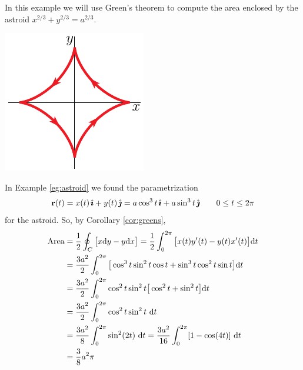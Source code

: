 \begin{eg}\label{eg:greenB}
In this example we will use Green's theorem to compute the area enclosed
by the astroid $x^{2/3} + y^{2/3} = a^{2/3}$.
\begin{nfig}
\begin{center}
    \includegraphics{astroid6.pdf}
\end{center}
\end{nfig}
In Example \ref{eg:astroid} we found the parametrization
\begin{equation*}
\mathbf{r}(t) = x(t)\,\hat{\pmb{\imath}} + y(t)\,\hat{\pmb{\jmath}} = a\cos^3t\,\hat{\pmb{\imath}} + a\sin^3 t\,\hat{\pmb{\jmath}}
\qquad 0\le t\le 2\pi
\end{equation*}
for the astroid. So, by Corollary \ref{cor:greens},
\begin{align*}
\text{Area}
&=\frac{1}{2}\oint_C \big[x\mathrm{d}y -y\mathrm{d}x\big]
 =\frac{1}{2}\int_0^{2\pi} \big[x(t)y'(t) -y(t)x'(t)\big]\mathrm{d}t \\
&=\frac{3a^2}{2}\int_0^{2\pi} \big[\cos^3t\sin^2t\cos t 
                                 +\sin^3t\cos^2 t\sin t\big]\mathrm{d}t \\
&=\frac{3a^2}{2}\int_0^{2\pi} \cos^2t\sin^2t\big[\cos^2t 
                                 +\sin^2t\big]\mathrm{d}t \\
&=\frac{3a^2}{2}\int_0^{2\pi} \cos^2t\sin^2t\ \mathrm{d}t \\
&=\frac{3a^2}{8}\int_0^{2\pi} \sin^2(2t)\ \mathrm{d}t 
=\frac{3a^2}{16}\int_0^{2\pi} [1-\cos(4t)]\ \mathrm{d}t \\
&=\frac{3}{8}a^2\pi
\end{align*}
\end{eg}

